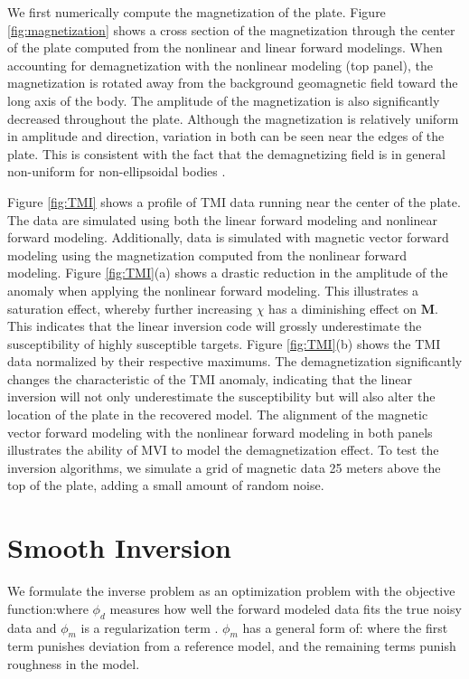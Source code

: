 \documentclass{segabs}
\begin{document}


We first numerically compute the magnetization of the plate. Figure \ref{fig:magnetization} shows a cross section of the magnetization through the center of the plate computed from the nonlinear and linear forward modelings. When accounting for demagnetization with the nonlinear modeling (top panel), the magnetization is rotated away from the background geomagnetic field toward the long axis of the body. The amplitude of the magnetization is also significantly decreased throughout the plate. Although the magnetization is relatively uniform in amplitude and direction, variation in both can be seen near the edges of the plate. This is consistent with the fact that the demagnetizing field is in general non-uniform for non-ellipsoidal bodies \citep{Clark2014}.

Figure \ref{fig:TMI} shows a profile of TMI data running near the center of the plate. The data are simulated using both the linear forward modeling and nonlinear forward modeling. Additionally, data is simulated with magnetic vector forward modeling using the magnetization computed from the nonlinear forward modeling.  Figure \ref{fig:TMI}(a) shows a drastic reduction in the amplitude of the anomaly when applying the nonlinear forward modeling. This illustrates a saturation effect, whereby further increasing $\chi$ has a diminishing effect on $\mathbf{M}$. This indicates that the linear inversion code will grossly underestimate the susceptibility of highly susceptible targets. Figure \ref{fig:TMI}(b) shows the TMI data normalized by their respective maximums. The demagnetization significantly changes the characteristic of the TMI anomaly, indicating that the linear inversion will not only underestimate the susceptibility but will also alter the location of the plate in the recovered model. The alignment of the magnetic vector forward modeling with the nonlinear forward modeling in both panels illustrates the ability of MVI to model the demagnetization effect. To test the inversion algorithms, we simulate a grid of magnetic data 25 meters above the top of the plate, adding a small amount of random noise.

\section{Smooth Inversion}

 We formulate the inverse problem as an optimization problem with the objective function:where $\phi_d$ measures how well the forward modeled data fits the true noisy data and $\phi_m$ is a regularization term  \citep{Oldenburg2005,Tikhonov1977}. $\phi_m$ has a general form of:
where the first term punishes deviation from a reference model, and the remaining terms punish roughness in the model.
\end{document}
